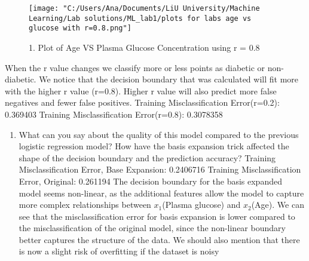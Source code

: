 \documentclass[
]{article}
\providecommand{\tightlist}{%
  \setlength{\itemsep}{0pt}\setlength{\parskip}{0pt}}
\begin{document}
\begin{figure}
\centering
\texttt{[image: "C:/Users/Ana/Documents/LiU University/Machine Learning/Lab solutions/ML\_lab1/plots for labs age vs glucose with r=0.8.png"]}
\caption{1. Plot of Age VS Plasma Glucose Concentration using r = 0.8}
\end{figure}

When the r value changes we classify more or less points as diabetic or
non-diabetic. We notice that the decision boundary that was calculated
will fit more with the higher r value (r=0.8). Higher r value will also
predict more false negatives and fewer false positives. Training
Misclassification Error(r=0.2): 0.369403 Training Misclassification
Error(r=0.8): 0.3078358

\begin{enumerate}
\def\labelenumi{\arabic{enumi}.}
\setcounter{enumi}{4}
\tightlist
\item
  What can you say about the quality of this model compared to the
  previous logistic regression model? How have the basis expansion trick
  affected the shape of the decision boundary and the prediction
  accuracy? Training Misclassification Error, Base Expansion: 0.2406716
  Training Misclassification Error, Original: 0.261194 The decision
  boundary for the basis expanded model seems non-linear, as the
  additional features allow the model to capture more complex
  relationships between \(x_1\)(Plasma glucose) and \(x_2\)(Age). We can
  see that the misclassification error for basis expansion is lower
  compared to the misclassification of the original model, since the
  non-linear boundary better captures the structure of the data. We
  should also mention that there is now a slight risk of overfitting if
  the dataset is noisy
\end{enumerate}
\end{document}
